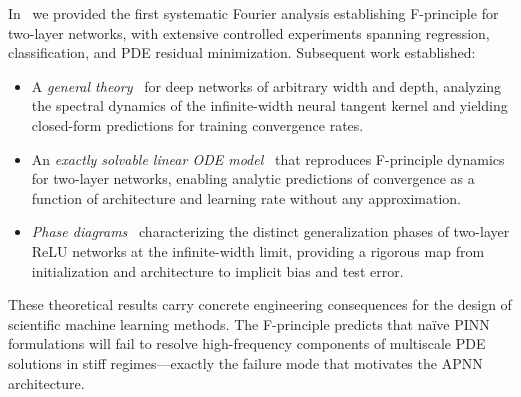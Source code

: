In~\cite{FP1} we provided the first systematic Fourier analysis
establishing F-principle for two-layer networks, with extensive controlled
experiments spanning regression, classification, and PDE residual
minimization.  Subsequent work established:
\begin{itemize}
  \item A \emph{general theory}~\cite{Luo2021} for deep networks of
    arbitrary width and depth, analyzing the spectral dynamics of the
    infinite-width neural tangent kernel and yielding closed-form predictions
    for training convergence rates.

  \item An \emph{exactly solvable linear ODE model}~\cite{Luo2022} that
    reproduces F-principle dynamics for two-layer networks, enabling analytic
    predictions of convergence as a function of architecture and learning rate
    without any approximation.

  \item \emph{Phase diagrams}~\cite{PD21} characterizing the distinct
    generalization phases of two-layer ReLU networks at the infinite-width
    limit, providing a rigorous map from initialization and architecture to
    implicit bias and test error.
\end{itemize}

These theoretical results carry concrete engineering consequences for the
design of scientific machine learning methods.  The F-principle predicts
that na\"{i}ve PINN formulations will fail to resolve high-frequency
components of multiscale PDE solutions in stiff regimes---exactly the failure
mode that motivates the APNN architecture.


